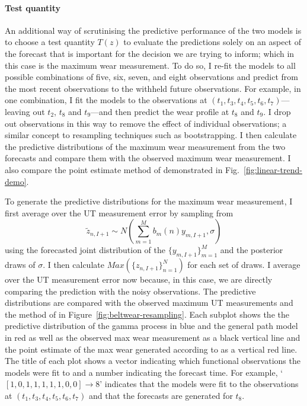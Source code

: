 \paragraph*{Test quantity}
An additional way of scrutinising the predictive performance of the two models is to choose a test quantity $T(z)$ \citep[p. 145]{BDA2020} to evaluate the predictions solely on an aspect of the forecast that is important for the decision we are trying to inform; which in this case is the maximum wear measurement. To do so, I re-fit the models to all possible combinations of five, six, seven, and eight observations and predict from the most recent observations to the withheld future observations. For example, in one combination, I fit the models to the observations at $(t_1, t_3, t_4, t_5, t_6, t_7)$---leaving out $t_2$, $t_8$ and $t_9$---and then predict the wear profile at $t_8$ and $t_9$. I drop out observations in this way to remove the effect of individual observations; a similar concept to resampling techniques such as bootstrapping. I then calculate the predictive distributions of the maximum wear measurement from the two forecasts and compare them with the observed maximum wear measurement. I also compare the point estimate method of \citet{webb_2020} demonstrated in Fig.~\ref{fig:linear-trend-demo}.

To generate the predictive distributions for the maximum wear measurement, I first average over the UT measurement error by sampling from
\begin{equation}
  \tilde{z}_{n, I + 1} \sim N \left( \sum^{M}_{m = 1}b_m(n)y_{m, I + 1}, \sigma \right)
\end{equation}
using the forecasted joint distribution of the $\{y_{m, I + 1}\}^M_{m = 1}$ and the posterior draws of $\sigma$. I then calculate $Max(\{z_{n, I + 1}\}^N_{n = 1})$ for each set of draws. I average over the UT measurement error now because, in this case, we are directly comparing the prediction with the noisy observations. The predictive distributions are compared with the observed maximum UT measurements and the method of \citet{webb_2020} in Figure~\ref{fig:beltwear-resampling}. Each subplot shows the the predictive distribution of the gamma process in blue and the general path model in red as well as the observed max wear measurement as a black vertical line and the point estimate of the max wear generated according to \citet{webb_2020} as a vertical red line. The title of each plot shows a vector indicating which functional observations the models were fit to and a number indicating the forecast time. For example, `$[1, 0, 1, 1, 1, 1, 1, 0, 0] \rightarrow 8$' indicates that the models were fit to the observations at $(t_1, t_3, t_4, t_5, t_6, t_7)$ and that the forecasts are generated for $t_8$.

